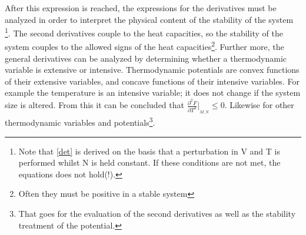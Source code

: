 After this expression is reached, the expressions for the derivatives must be analyzed in order to interpret the physical content of the stability of the system \footnote{Note that \ref{det} is derived on the basis that a perturbation in V and T is performed whilst N is held constant. If these conditions are not met, the equations does not hold(!).}. The second derivatives couple to the heat capacities, so the stability of the system couples to the allowed signs of the heat capacities\footnote{Often they must be positive in a stable system}. Further more, the general derivatives can be analyzed by determining whether a thermodynamic variable is extensive or intensive. Thermodynamic potentials are convex functions of their extensive variables, and concave functions of their intensive variables. For example the temperature is an intensive variable; it does not change if the system size is altered. From this it can be concluded that $\frac{\partial^2 F}{\partial T^2}\big|_{_{M,N}}\leq0$. Likewise for other thermodynamic variables and potentials\footnote{That goes for the evaluation of the second derivatives as well as the stability treatment of the potential.}.